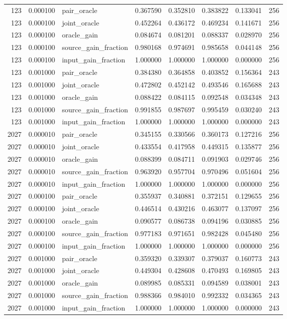 \begin{tabular}{rrlrrrrr}
123 & 0.000100 & pair_oracle & 0.367590 & 0.352810 & 0.383822 & 0.133041 & 256 \\
123 & 0.000100 & joint_oracle & 0.452264 & 0.436172 & 0.469234 & 0.141671 & 256 \\
123 & 0.000100 & oracle_gain & 0.084674 & 0.081201 & 0.088337 & 0.028970 & 256 \\
123 & 0.000100 & source_gain_fraction & 0.980168 & 0.974691 & 0.985658 & 0.044148 & 256 \\
123 & 0.000100 & input_gain_fraction & 1.000000 & 1.000000 & 1.000000 & 0.000000 & 256 \\
123 & 0.001000 & pair_oracle & 0.384380 & 0.364858 & 0.403852 & 0.156364 & 243 \\
123 & 0.001000 & joint_oracle & 0.472802 & 0.452142 & 0.493546 & 0.165688 & 243 \\
123 & 0.001000 & oracle_gain & 0.088422 & 0.084115 & 0.092548 & 0.034348 & 243 \\
123 & 0.001000 & source_gain_fraction & 0.991855 & 0.987697 & 0.995459 & 0.030240 & 243 \\
123 & 0.001000 & input_gain_fraction & 1.000000 & 1.000000 & 1.000000 & 0.000000 & 243 \\
2027 & 0.000010 & pair_oracle & 0.345155 & 0.330566 & 0.360173 & 0.127216 & 256 \\
2027 & 0.000010 & joint_oracle & 0.433554 & 0.417958 & 0.449315 & 0.135877 & 256 \\
2027 & 0.000010 & oracle_gain & 0.088399 & 0.084711 & 0.091903 & 0.029746 & 256 \\
2027 & 0.000010 & source_gain_fraction & 0.963920 & 0.957704 & 0.970496 & 0.051604 & 256 \\
2027 & 0.000010 & input_gain_fraction & 1.000000 & 1.000000 & 1.000000 & 0.000000 & 256 \\
2027 & 0.000100 & pair_oracle & 0.355937 & 0.340881 & 0.372151 & 0.129655 & 256 \\
2027 & 0.000100 & joint_oracle & 0.446514 & 0.430216 & 0.463077 & 0.137097 & 256 \\
2027 & 0.000100 & oracle_gain & 0.090577 & 0.086738 & 0.094196 & 0.030885 & 256 \\
2027 & 0.000100 & source_gain_fraction & 0.977183 & 0.971651 & 0.982428 & 0.045480 & 256 \\
2027 & 0.000100 & input_gain_fraction & 1.000000 & 1.000000 & 1.000000 & 0.000000 & 256 \\
2027 & 0.001000 & pair_oracle & 0.359320 & 0.339307 & 0.379037 & 0.160773 & 243 \\
2027 & 0.001000 & joint_oracle & 0.449304 & 0.428608 & 0.470493 & 0.169805 & 243 \\
2027 & 0.001000 & oracle_gain & 0.089985 & 0.085331 & 0.094589 & 0.038001 & 243 \\
2027 & 0.001000 & source_gain_fraction & 0.988366 & 0.984010 & 0.992332 & 0.034365 & 243 \\
2027 & 0.001000 & input_gain_fraction & 1.000000 & 1.000000 & 1.000000 & 0.000000 & 243 \\
\bottomrule
\end{tabular}

